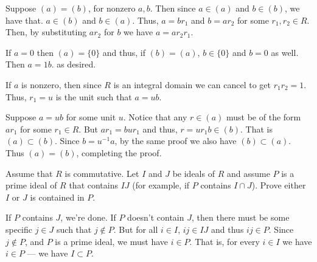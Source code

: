 \documentclass[12 pt, letterpaper]{hmcpset}
\begin{document}
\begin{solution}	
	Suppose $(a) = (b)$, for nonzero $a, b$. Then since $a \in (a)$ and $b \in (b)$, we have that. $a \in (b)$ and $b \in (a)$. Thus, $a = br_{1}$ and $b = a r_{2}$ for some $r_{1}, r_{2} \in R$. Then, by substituting $ar_{2}$ for $b$ we have $a = a r_{2} r_{1}$. 

	If $a = 0$ then $(a) = \{ 0 \}$ and thus, if $(b) = (a)$, $b \in \{ 0 \}$ and $b = 0$ as well. Then $a = 1 b$. as desired. 
	
	If $a$ is nonzero, then since $R$ is an integral domain we can cancel to get $r_{1} r_{2} = 1$. Thus, $r_{1} = u$ is the unit such that $a = ub$. 

	Suppose $a = ub$ for some unit $u$. Notice that any $r \in (a)$ must be of the form $ar_{1}$ for some $r_{1} \in R$. But $ar_{1} = b u r_{1}$ and thus, $r = u r_{1} b \in (b)$. That is $(a) \subset (b)$. Since $b = u^{-1} a$, by the same proof we also have $(b) \subset (a)$. Thus $(a) = (b)$, completing the proof.
\end{solution}

\pagebreak

\begin{problem}
	Assume that $R$ is commutative. Let $I$ and $J$ be ideals of $R$ and assume $P$ is a prime ideal of $R$ that contains $IJ$ (for example, if $P$ contains $I \cap J$). Prove either $I$ or $J$ is contained in $P$.
\end{problem}

\begin{solution}
	If $P$ contains $J$, we're done. If $P$ doesn't contain $J$, then there must be some specific $j \in J$ such that $j \notin P$. But for all $i \in I$, $ij \in IJ$ and thus $ij \in P$. Since $j \notin P$, and $P$ is a prime ideal, we must have $i \in P$. That is, for every $i \in I$ we have $i \in P$ --- we have $I \subset P$.
\end{solution}
\end{document}
